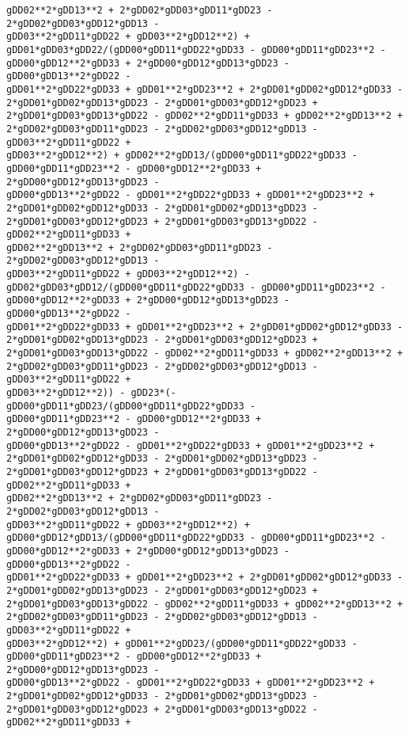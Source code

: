 \documentclass[landscape,letterpaper,10pt,english]{article}
\begin{document}
\begin{Verbatim}[commandchars=\\\{\}]
gDD02**2*gDD13**2 + 2*gDD02*gDD03*gDD11*gDD23 - 2*gDD02*gDD03*gDD12*gDD13 -
gDD03**2*gDD11*gDD22 + gDD03**2*gDD12**2) +
gDD01*gDD03*gDD22/(gDD00*gDD11*gDD22*gDD33 - gDD00*gDD11*gDD23**2 -
gDD00*gDD12**2*gDD33 + 2*gDD00*gDD12*gDD13*gDD23 - gDD00*gDD13**2*gDD22 -
gDD01**2*gDD22*gDD33 + gDD01**2*gDD23**2 + 2*gDD01*gDD02*gDD12*gDD33 -
2*gDD01*gDD02*gDD13*gDD23 - 2*gDD01*gDD03*gDD12*gDD23 +
2*gDD01*gDD03*gDD13*gDD22 - gDD02**2*gDD11*gDD33 + gDD02**2*gDD13**2 +
2*gDD02*gDD03*gDD11*gDD23 - 2*gDD02*gDD03*gDD12*gDD13 - gDD03**2*gDD11*gDD22 +
gDD03**2*gDD12**2) + gDD02**2*gDD13/(gDD00*gDD11*gDD22*gDD33 -
gDD00*gDD11*gDD23**2 - gDD00*gDD12**2*gDD33 + 2*gDD00*gDD12*gDD13*gDD23 -
gDD00*gDD13**2*gDD22 - gDD01**2*gDD22*gDD33 + gDD01**2*gDD23**2 +
2*gDD01*gDD02*gDD12*gDD33 - 2*gDD01*gDD02*gDD13*gDD23 -
2*gDD01*gDD03*gDD12*gDD23 + 2*gDD01*gDD03*gDD13*gDD22 - gDD02**2*gDD11*gDD33 +
gDD02**2*gDD13**2 + 2*gDD02*gDD03*gDD11*gDD23 - 2*gDD02*gDD03*gDD12*gDD13 -
gDD03**2*gDD11*gDD22 + gDD03**2*gDD12**2) -
gDD02*gDD03*gDD12/(gDD00*gDD11*gDD22*gDD33 - gDD00*gDD11*gDD23**2 -
gDD00*gDD12**2*gDD33 + 2*gDD00*gDD12*gDD13*gDD23 - gDD00*gDD13**2*gDD22 -
gDD01**2*gDD22*gDD33 + gDD01**2*gDD23**2 + 2*gDD01*gDD02*gDD12*gDD33 -
2*gDD01*gDD02*gDD13*gDD23 - 2*gDD01*gDD03*gDD12*gDD23 +
2*gDD01*gDD03*gDD13*gDD22 - gDD02**2*gDD11*gDD33 + gDD02**2*gDD13**2 +
2*gDD02*gDD03*gDD11*gDD23 - 2*gDD02*gDD03*gDD12*gDD13 - gDD03**2*gDD11*gDD22 +
gDD03**2*gDD12**2)) - gDD23*(-gDD00*gDD11*gDD23/(gDD00*gDD11*gDD22*gDD33 -
gDD00*gDD11*gDD23**2 - gDD00*gDD12**2*gDD33 + 2*gDD00*gDD12*gDD13*gDD23 -
gDD00*gDD13**2*gDD22 - gDD01**2*gDD22*gDD33 + gDD01**2*gDD23**2 +
2*gDD01*gDD02*gDD12*gDD33 - 2*gDD01*gDD02*gDD13*gDD23 -
2*gDD01*gDD03*gDD12*gDD23 + 2*gDD01*gDD03*gDD13*gDD22 - gDD02**2*gDD11*gDD33 +
gDD02**2*gDD13**2 + 2*gDD02*gDD03*gDD11*gDD23 - 2*gDD02*gDD03*gDD12*gDD13 -
gDD03**2*gDD11*gDD22 + gDD03**2*gDD12**2) +
gDD00*gDD12*gDD13/(gDD00*gDD11*gDD22*gDD33 - gDD00*gDD11*gDD23**2 -
gDD00*gDD12**2*gDD33 + 2*gDD00*gDD12*gDD13*gDD23 - gDD00*gDD13**2*gDD22 -
gDD01**2*gDD22*gDD33 + gDD01**2*gDD23**2 + 2*gDD01*gDD02*gDD12*gDD33 -
2*gDD01*gDD02*gDD13*gDD23 - 2*gDD01*gDD03*gDD12*gDD23 +
2*gDD01*gDD03*gDD13*gDD22 - gDD02**2*gDD11*gDD33 + gDD02**2*gDD13**2 +
2*gDD02*gDD03*gDD11*gDD23 - 2*gDD02*gDD03*gDD12*gDD13 - gDD03**2*gDD11*gDD22 +
gDD03**2*gDD12**2) + gDD01**2*gDD23/(gDD00*gDD11*gDD22*gDD33 -
gDD00*gDD11*gDD23**2 - gDD00*gDD12**2*gDD33 + 2*gDD00*gDD12*gDD13*gDD23 -
gDD00*gDD13**2*gDD22 - gDD01**2*gDD22*gDD33 + gDD01**2*gDD23**2 +
2*gDD01*gDD02*gDD12*gDD33 - 2*gDD01*gDD02*gDD13*gDD23 -
2*gDD01*gDD03*gDD12*gDD23 + 2*gDD01*gDD03*gDD13*gDD22 - gDD02**2*gDD11*gDD33 +

\end{Verbatim}
\end{document}
